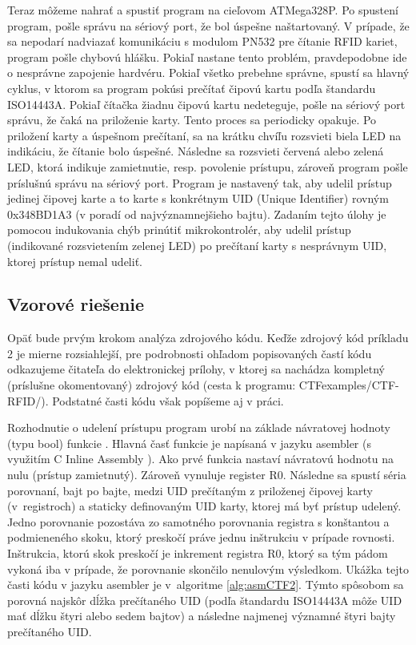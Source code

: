 Teraz môžeme nahrať a spustiť program na cieľovom ATMega328P. Po spustení program, pošle správu na sériový port, že bol úspešne naštartovaný. V prípade, že sa nepodarí nadviazať komunikáciu s modulom PN532 pre čítanie RFID kariet, program pošle chybovú hlášku. Pokiaľ nastane tento problém, pravdepodobne ide o nesprávne zapojenie hardvéru. Pokiaľ všetko prebehne správne, spustí sa hlavný cyklus, v ktorom sa program pokúsi prečítať čipovú kartu podľa štandardu ISO14443A. Pokiaľ čítačka žiadnu čipovú kartu nedeteguje, pošle na sériový port správu, že čaká na priloženie karty. Tento proces sa periodicky opakuje. Po priložení karty a úspešnom prečítaní, sa na krátku chvíľu rozsvieti biela LED na indikáciu, že čítanie bolo úspešné. Následne sa rozsvieti červená alebo zelená LED, ktorá indikuje zamietnutie, resp. povolenie prístupu, zároveň program pošle príslušnú správu na sériový port. Program je nastavený tak, aby udelil prístup jedinej čipovej karte a to karte s konkrétnym UID (Unique Identifier) rovným 0x348BD1A3 (v poradí od najvýznamnejšieho bajtu). Zadaním tejto úlohy je pomocou indukovania chýb prinútiť mikrokontrolér, aby udelil prístup (indikované rozsvietením zelenej LED) po prečítaní karty s nesprávnym UID, ktorej prístup nemal udeliť.

\subsection{Vzorové riešenie}
Opäť bude prvým krokom analýza zdrojového kódu. Keďže zdrojový kód príkladu 2 je mierne rozsiahlejší, pre podrobnosti ohľadom popisovaných častí kódu odkazujeme čitateľa do elektronickej prílohy, v ktorej sa nachádza kompletný (príslušne okomentovaný) zdrojový kód (cesta k programu: {\color{olive} CTFexamples/CTF-RFID/}). Podstatné časti kódu však popíšeme aj v práci.

Rozhodnutie o udelení prístupu program urobí na základe návratovej hodnoty (typu bool) funkcie . Hlavná časť funkcie  je napísaná v jazyku asembler (s využitím C Inline Assembly \cite{inlineAsm}). Ako prvé funkcia nastaví návratovú hodnotu na nulu (prístup zamietnutý). Zároveň vynuluje register R0. Následne sa spustí séria porovnaní, bajt po bajte, medzi UID prečítaným z priloženej čipovej karty (v~registroch) a staticky definovaným UID karty, ktorej má byť prístup udelený. Jedno porovnanie pozostáva zo samotného porovnania registra s konštantou a podmieneného skoku, ktorý preskočí práve jednu inštrukciu v prípade rovnosti. Inštrukcia, ktorú skok preskočí je inkrement registra R0, ktorý sa tým pádom vykoná iba v prípade, že porovnanie skončilo nenulovým výsledkom. Ukážka tejto časti kódu v jazyku asembler je v~algoritme \ref{alg:asmCTF2}. Týmto spôsobom sa porovná najskôr dĺžka prečítaného UID (podľa štandardu ISO14443A môže UID mať dĺžku štyri alebo sedem bajtov) a následne najmenej významné štyri bajty prečítaného UID. 

